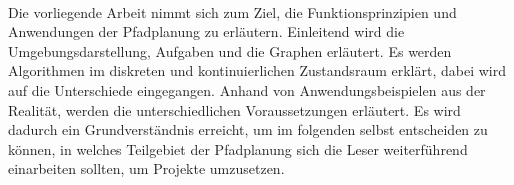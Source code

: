 
\kurzfassung

\paragraph*{}

Die vorliegende Arbeit nimmt sich zum Ziel, die Funktionsprinzipien und Anwendungen der Pfadplanung zu erläutern. Einleitend wird die Umgebungsdarstellung, Aufgaben und die Graphen erläutert. Es werden Algorithmen im diskreten und kontinuierlichen Zustandsraum erklärt, dabei wird auf die Unterschiede eingegangen. Anhand von Anwendungsbeispielen aus der Realität, werden die unterschiedlichen Voraussetzungen erläutert.
Es wird dadurch ein Grundverständnis erreicht, um im folgenden selbst entscheiden zu können, in welches Teilgebiet der Pfadplanung sich die Leser weiterführend einarbeiten sollten, um Projekte umzusetzen.

